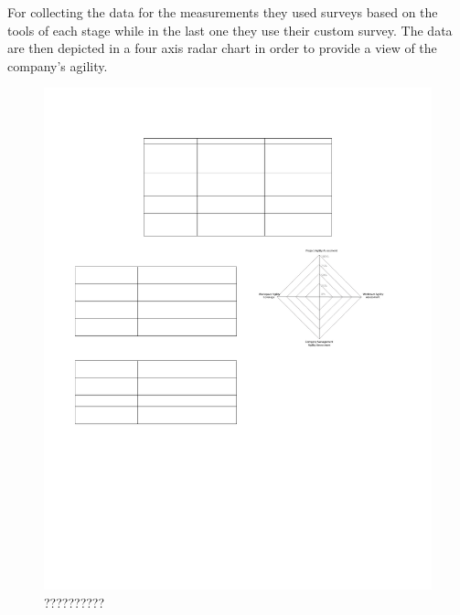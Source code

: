 For collecting the data for the measurements they used surveys based on the tools of each stage while in the last one they use their custom survey. The data are then depicted in a four axis radar chart in order to provide a view of the company's agility.

\begin{figure}
\centerline{\includegraphics[scale=0.9]{include/relatedwork/fig/escobar_radar.pdf}}
\caption{??????????} 
\label{??????}
\end{figure}

